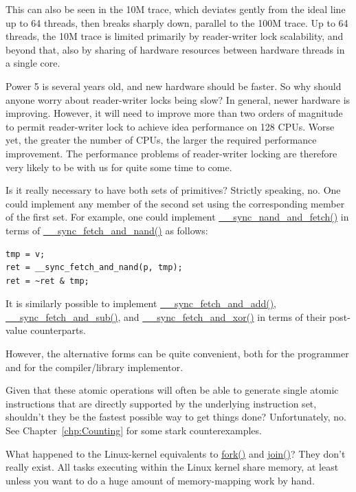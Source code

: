 	This can also be seen in the 10M trace, which deviates gently from
	the ideal line up to 64 threads, then breaks sharply down, parallel
	to the 100M trace.
	Up to 64 threads, the 10M trace is limited primarily by reader-writer
	lock scalability, and beyond that, also by sharing of hardware
	resources between hardware threads in a single core.

\QuickQ{}
	Power 5 is several years old, and new hardware should
	be faster.
	So why should anyone worry about reader-writer locks being slow?
\QuickA{}
	In general, newer hardware is improving.
	However, it will need to improve more than two orders of magnitude
	to permit reader-writer lock to achieve idea performance on
	128 CPUs.
	Worse yet, the greater the number of CPUs, the larger the
	required performance improvement.
	The performance problems of reader-writer locking are therefore
	very likely to be with us for quite some time to come.

\QuickQ{}
	Is it really necessary to have both sets of primitives?
\QuickA{}
	Strictly speaking, no.
	One could implement any member of the second set using the
	corresponding member of the first set.
	For example, one could implement \url{__sync_nand_and_fetch()}
	in terms of \url{__sync_fetch_and_nand()} as follows:

\vspace{5pt}
\begin{minipage}[t]{\columnwidth}
\begin{verbatim}
tmp = v;
ret = __sync_fetch_and_nand(p, tmp);
ret = ~ret & tmp;
\end{verbatim}
\end{minipage}
\vspace{5pt}

	It is similarly possible to implement \url{__sync_fetch_and_add()},
	\url{__sync_fetch_and_sub()}, and \url{__sync_fetch_and_xor()}
	in terms of their post-value counterparts.

	However, the alternative forms can be quite convenient, both
	for the programmer and for the compiler/library implementor.

\QuickQ{}
	Given that these atomic operations will often be able to
	generate single atomic instructions that are directly
	supported by the underlying instruction set, shouldn't
	they be the fastest possible way to get things done?
\QuickA{}
	Unfortunately, no.
	See Chapter~\ref{chp:Counting} for some stark counterexamples.

\QuickQ{}
	What happened to the Linux-kernel equivalents to \url{fork()}
	and \url{join()}?
\QuickA{}
	They don't really exist.
	All tasks executing within the Linux kernel share memory,
	at least unless you want to do a huge amount of memory-mapping
	work by hand.

